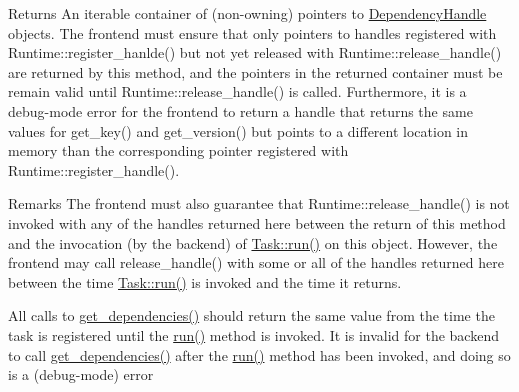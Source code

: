 \begin{DoxyReturn}{Returns}
An iterable container of (non-\/owning) pointers to \hyperlink{classdarma__runtime_1_1abstract_1_1frontend_1_1_dependency_handle}{Dependency\+Handle} objects. The frontend must ensure that only pointers to handles registered with Runtime\+::register\+\_\+hanlde() but not yet released with Runtime\+::release\+\_\+handle() are returned by this method, and the pointers in the returned container must be remain valid until Runtime\+::release\+\_\+handle() is called. Furthermore, it is a debug-\/mode error for the frontend to return a handle that returns the same values for get\+\_\+key() and get\+\_\+version() but points to a different location in memory than the corresponding pointer registered with Runtime\+::register\+\_\+handle().
\end{DoxyReturn}
\begin{DoxyRemark}{Remarks}
The frontend must also guarantee that Runtime\+::release\+\_\+handle() is not invoked with any of the handles returned here between the return of this method and the invocation (by the backend) of \hyperlink{classdarma__runtime_1_1abstract_1_1frontend_1_1_task_a0b17be7ac7b74aa1e1c54ce3f527cd14}{Task\+::run()} on this object. However, the frontend may call release\+\_\+handle() with some or all of the handles returned here between the time \hyperlink{classdarma__runtime_1_1abstract_1_1frontend_1_1_task_a0b17be7ac7b74aa1e1c54ce3f527cd14}{Task\+::run()} is invoked and the time it returns.

All calls to \hyperlink{classdarma__runtime_1_1abstract_1_1frontend_1_1_task_adbe380f89b64b6a60278ab5a62f96c06}{get\+\_\+dependencies()} should return the same value from the time the task is registered until the \hyperlink{classdarma__runtime_1_1abstract_1_1frontend_1_1_task_a0b17be7ac7b74aa1e1c54ce3f527cd14}{run()} method is invoked. It is invalid for the backend to call \hyperlink{classdarma__runtime_1_1abstract_1_1frontend_1_1_task_adbe380f89b64b6a60278ab5a62f96c06}{get\+\_\+dependencies()} after the \hyperlink{classdarma__runtime_1_1abstract_1_1frontend_1_1_task_a0b17be7ac7b74aa1e1c54ce3f527cd14}{run()} method has been invoked, and doing so is a (debug-\/mode) error 
\end{DoxyRemark}

